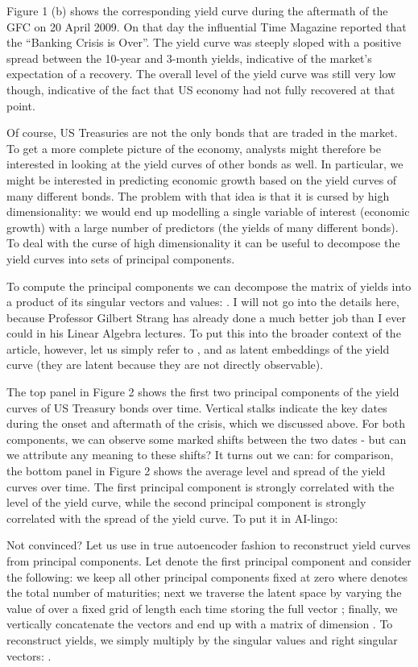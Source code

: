 \documentclass{article}
\theoremstyle{plain}
\theoremstyle{definition}
\theoremstyle{remark}
\begin{document}
Figure 1 (b) shows the corresponding yield curve during the aftermath of the GFC on 20 April 2009. On that day the influential Time Magazine reported that the “Banking Crisis is Over”. The yield curve was steeply sloped with a positive spread between the 10-year and 3-month yields, indicative of the market’s expectation of a recovery. The overall level of the yield curve was still very low though, indicative of the fact that US economy had not fully recovered at that point.

Of course, US Treasuries are not the only bonds that are traded in the market. To get a more complete picture of the economy, analysts might therefore be interested in looking at the yield curves of other bonds as well. In particular, we might be interested in predicting economic growth based on the yield curves of many different bonds. The problem with that idea is that it is cursed by high dimensionality: we would end up modelling a single variable of interest (economic growth) with a large number of predictors (the yields of many different bonds). To deal with the curse of high dimensionality it can be useful to decompose the yield curves into sets of principal components.

To compute the principal components we can decompose the matrix of yields 
 into a product of its singular vectors and values: 
. I will not go into the details here, because Professor Gilbert Strang has already done a much better job than I ever could in his Linear Algebra lectures. To put this into the broader context of the article, however, let us simply refer to 
, 
 and 
 as latent embeddings of the yield curve (they are latent because they are not directly observable).

The top panel in Figure 2 shows the first two principal components of the yield curves of US Treasury bonds over time. Vertical stalks indicate the key dates during the onset and aftermath of the crisis, which we discussed above. For both components, we can observe some marked shifts between the two dates - but can we attribute any meaning to these shifts? It turns out we can: for comparison, the bottom panel in Figure 2 shows the average level and spread of the yield curves over time. The first principal component is strongly correlated with the level of the yield curve, while the second principal component is strongly correlated with the spread of the yield curve. To put it in AI-lingo:


Not convinced? Let us use 
 in true autoencoder fashion to reconstruct yield curves from principal components. Let 
 denote the first principal component and consider the following: we keep all other 
 principal components fixed at zero where 
 denotes the total number of maturities; next we traverse the latent space by varying the value of 
 over a fixed grid of length 
 each time storing the full vector 
; finally, we vertically concatenate the vectors and end up with a matrix 
 of dimension 
. To reconstruct yields, we simply multiply 
 by the singular values and right singular vectors: 
.
\end{document}
